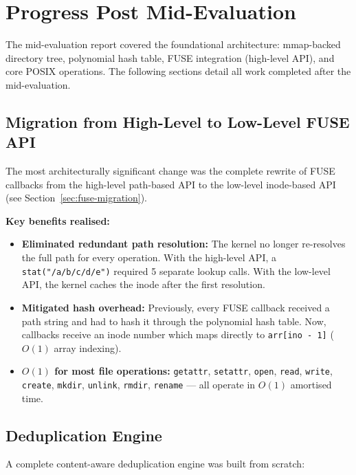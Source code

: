 \documentclass[12pt, a4paper]{article}
\begin{document}
\section{Progress Post Mid-Evaluation}

The mid-evaluation report covered the foundational architecture: mmap-backed directory tree, polynomial hash table, FUSE integration (high-level API), and core POSIX operations. The following sections detail all work completed after the mid-evaluation.

\subsection{Migration from High-Level to Low-Level FUSE API}

The most architecturally significant change was the complete rewrite of FUSE callbacks from the high-level path-based API to the low-level inode-based API (see Section~\ref{sec:fuse-migration}).

\textbf{Key benefits realised:}
\begin{itemize}
  \item \textbf{Eliminated redundant path resolution:} The kernel no longer re-resolves the full path for every operation. With the high-level API, a \texttt{stat("/a/b/c/d/e")} required 5 separate lookup calls. With the low-level API, the kernel caches the inode after the first resolution.
  \item \textbf{Mitigated hash overhead:} Previously, every FUSE callback received a path string and had to hash it through the polynomial hash table. Now, callbacks receive an inode number which maps directly to \texttt{arr[ino - 1]} ($O(1)$ array indexing).
  \item \textbf{$O(1)$ for most file operations:} \texttt{getattr}, \texttt{setattr}, \texttt{open}, \texttt{read}, \texttt{write}, \texttt{create}, \texttt{mkdir}, \texttt{unlink}, \texttt{rmdir}, \texttt{rename} --- all operate in $O(1)$ amortised time.
\end{itemize}

\subsection{Deduplication Engine}

A complete content-aware deduplication engine was built from scratch:
\end{document}

